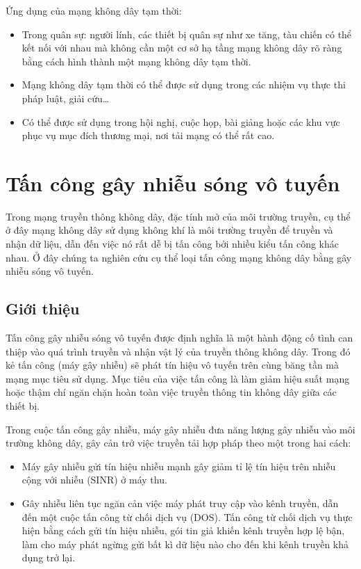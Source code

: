 \documentclass{uetgraduation}
\begin{document}
\begin{itemize}
    Ứng dụng của mạng không dây tạm thời:
    \begin{itemize}
        \item Trong quân sự: người lính, các thiết bị quân sự như xe tăng, tàu chiến có thể kết nối với nhau mà không cần một cơ sở hạ tầng mạng không dây rõ ràng
        bằng cách hình thành một mạng không dây tạm thời.
        \item Mạng không dây tạm thời có thể được sử dụng trong các nhiệm vụ thực thi pháp luật, giải cứu\dots
        \item Có thể được sử dụng trong hội nghị, cuộc họp, bài giảng hoặc các khu vực phục vụ mục đích thương mại, nơi tải mạng có thể rất cao.
    \end{itemize}
\end{itemize}


\section{Tấn công gây nhiễu sóng vô tuyến}
Trong mạng truyền thông không dây, đặc tính mở của môi trường truyền, cụ thể ở đây mạng không dây sử dụng không khí là môi trường truyền để truyền và nhận dữ
liệu, dẫn đến việc nó rất dễ bị tấn công bởi nhiều kiểu tấn công khác nhau. Ở đây chúng ta nghiên cứu cụ thể loại tấn công mạng không dây bằng gây nhiễu sóng
vô tuyến.

\subsection{Giới thiệu}
Tấn công gây nhiễu sóng vô tuyến được định nghĩa là một hành động cố tình can thiệp vào quá trình truyền và nhận vật lý của truyền thông
không dây. Trong đó kẻ tấn công (máy gây nhiễu) sẽ phát tín hiệu vô tuyến trên cùng băng tần mà mạng mục tiêu sử dụng. Mục tiêu của việc
tấn công là làm giảm hiệu suất mạng hoặc thậm chí ngăn chặn hoàn toàn việc truyền thông tin không dây giữa các thiết bị.

Trong cuộc tấn công gây nhiễu, máy gây nhiễu đưa năng lượng gây nhiễu vào môi trường không dây, gây cản trở việc truyền tải hợp pháp theo
một trong hai cách: 
\begin{itemize}
    \item Máy gây nhiễu gửi tín hiệu nhiễu mạnh gây giảm tỉ lệ tín hiệu trên nhiễu cộng với nhiễu (SINR) ở máy thu.
    \item Gây nhiễu liên tục ngăn cản việc máy phát truy cập vào kênh truyền, dẫn đến một cuộc tấn công từ chối dịch vụ (DOS). Tấn công từ
    chối dịch vụ thực hiện bằng cách gửi tín hiệu nhiễu, gói tin giả khiến kênh truyền hợp lệ bận, làm cho máy phát ngừng gửi bất kì dữ liệu nào
    cho đến khi kênh truyền khả dụng trở lại.
\end{itemize}
\end{document}
